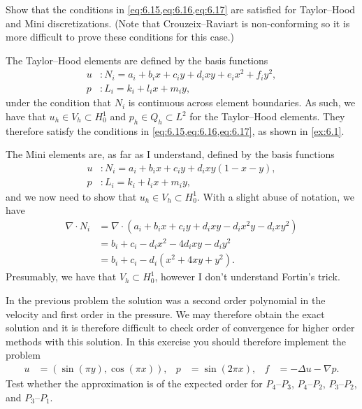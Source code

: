 \begin{exercise}{6.2}
    Show that the conditions in \cref{eq:6.15,eq:6.16,eq:6.17} are satisfied for Taylor--Hood and Mini discretizations. %
    (Note that Crouzeix--Raviart is non-conforming so it is more difficult to prove these conditions for this case.) %
\end{exercise}

\begin{solution}{6.2}
    The Taylor--Hood elements are defined by the basis functions %
    \begin{equation}
        \begin{split}
            u &: N_i = a_i + b_i x + c_i y + d_i x y + e_i x^2 + f_i y^2, \\
            p &: L_i = k_i + l_i x + m_i y,
        \end{split}
    \end{equation}
    under the condition that $N_i$ is continuous across element boundaries.
    As such, we have that $u_h \in V_h \subset H^1_0$ and $p_h \in Q_h \subset L^2$ for the Taylor--Hood elements. %
    They therefore satisfy the conditions in \cref{eq:6.15,eq:6.16,eq:6.17}, as shown in \cref{ex:6.1}.

    The Mini elements are, as far as I understand, defined by the basis functions
    \begin{equation}
        \begin{split}
            u &: N_i = a_i + b_i x + c_i y + d_i xy(1 - x - y), \\
            p &: L_i = k_i + l_i x + m_i y,
        \end{split}
    \end{equation}
    and we now need to show that $u_h \in V_h \subset H^1_0$.
    With a slight abuse of notation, we have
    \begin{align*}
        \nabla \cdot N_i &=
        \nabla \cdot (a_i + b_i x + c_i y + d_i xy - d_i x^2 y - d_i x y^2) \\
        &= b_i + c_i - d_i x^2 - 4d_i xy - d_i y^2 \\
        &= b_i + c_i - d_i (x^2 + 4xy + y^2).
    \end{align*}
    Presumably, we have that $V_h \subset H^1_0$, however I don't understand Fortin's trick.
\end{solution}

\begin{exercise}{6.6}
    In the previous problem the solution was a second order polynomial in the velocity and first order in the pressure.
    We may therefore obtain the exact solution and it is therefore difficult to check order of convergence for higher order methods with this solution.
    In this exercise you should therefore implement the problem
    \begin{align*}
        u &= (\sin(\pi y), \cos(\pi x)),
        & p &= \sin(2 \pi x),
        & f &= -\Delta u - \nabla p.
    \end{align*}
    Test whether the approximation is of the expected order for $P_4$--$P_3$, $P_4$--$P_2$, $P_3$--$P_2$, and $P_3$--$P_1$.
\end{exercise}